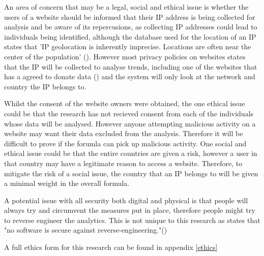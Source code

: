 
An area of concern that may be a legal, social and ethical issue is whether the users of a website should be informed that their IP address is being collected for analysis and be aware of its repercusions, as collecting IP addresses could lead to individuals being identified, although the database used for the location of an IP states that 'IP geolocation is inherently imprecise. Locations are often near the center of the population' (\cite{maxEthics}). However most privacy policies on websites states that the IP will be collected to analyse trends, including one of the websites that has a agreed to donate data (\cite{PetersWebPrivacy}) and the system will only look at the network and country the IP belongs to.


Whilst the  consent of the website owners were obtained, the one ethical issue could be that the research has not recieved consent from each of the individuals whose data will be analysed. However anyone attempting malicious activity on a website may want their data excluded from the analysis. Therefore it will be difficult to prove if the forumla can pick up malicious activity. One social and ethical issue could be that the entire countries are given a risk, however a user in that country may have a legitimate reason to access a website. Therefore, to mitigate the risk of a social issue, the country that an IP belongs to will be given a minimal weight in the overall formula. 

A potential issue with all security both digital and physical is that people will always try and circumvent the measures put in place, therefore people might try to reverse engineer the analytics. This is not unique to this research as \citeauthor{708447} states that "no software is secure against reverse-engineering."(\cite{708447})

A full ethics form for this research can be found in appendix \ref{ethics}

